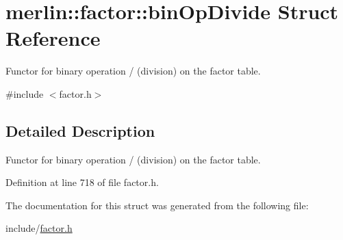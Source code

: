 \hypertarget{structmerlin_1_1factor_1_1binOpDivide}{}\section{merlin\+:\+:factor\+:\+:bin\+Op\+Divide Struct Reference}
\label{structmerlin_1_1factor_1_1binOpDivide}


Functor for binary operation / (division) on the factor table.  




{\ttfamily \#include $<$factor.\+h$>$}



\subsection{Detailed Description}
Functor for binary operation / (division) on the factor table. 

Definition at line 718 of file factor.\+h.



The documentation for this struct was generated from the following file\+:\begin{DoxyCompactItemize}
\item 
include/\hyperlink{factor_8h}{factor.\+h}\end{DoxyCompactItemize}

